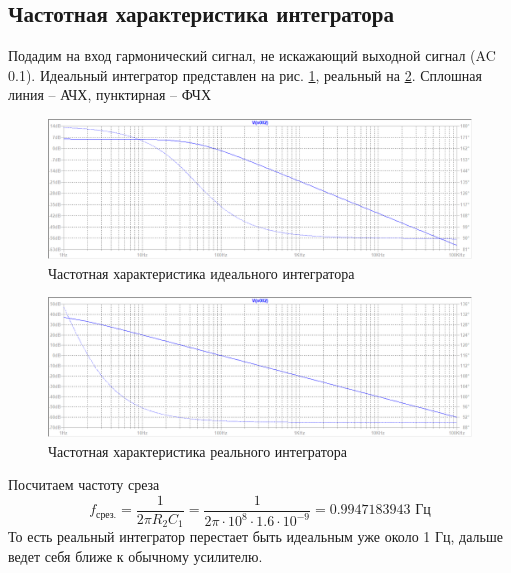 \documentclass[a4paper, 12pt]{article}
\begin{document}
    \subsection{Частотная характеристика интегратора}
    Подадим на вход гармонический сигнал, не искажающий выходной сигнал (AC 0.1). Идеальный
    интегратор представлен на рис. \ref{fig:3task_ideal_int}, реальный на \ref{fig:3task_real_int}.
    Сплошная линия -- АЧХ, пунктирная -- ФЧХ
    \begin{figure}[H]
        \centering
        \includegraphics[scale=0.46]{3task_ideal_int.png}
        \captionsetup{skip=0pt}
        \caption{Частотная характеристика идеального интегратора}
        \label{fig:3task_ideal_int}
    \end{figure}
    \begin{figure}[H]
        \centering
        \includegraphics[scale=0.46]{3task_real_int.png}
        \captionsetup{skip=0pt}
        \caption{Частотная характеристика реального интегратора}
        \label{fig:3task_real_int}
    \end{figure}
    \noindent Посчитаем частоту среза
    $$
    f_{\text{срез.}}=\dfrac{1}{2\pi R_2 C_1}=\dfrac{1}{2\pi\cdot10^8\cdot1.6\cdot10^{-9}}=0.9947183943\text{ Гц}
    $$
    То есть реальный интегратор перестает быть идеальным уже около 1 Гц, дальше ведет себя ближе к обычному усилителю.
\end{document}
